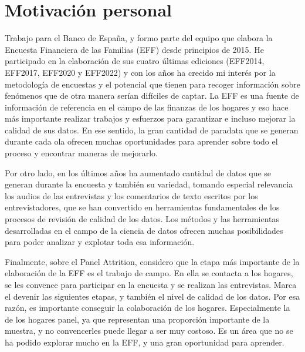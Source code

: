 \section{Motivación personal}

Trabajo para el Banco de España, y formo parte del equipo que elabora la Encuesta Financiera de las Familias (EFF) desde principios de 2015. He participado en la elaboración de sus cuatro últimas ediciones (EFF2014, EFF2017, EFF2020 y EFF2022) y con los años ha crecido mi interés por la metodología de encuestas y el potencial que tienen para recoger información sobre fenómenos que de otra manera serían difíciles de captar. La EFF es una fuente de información de referencia en el campo de las finanzas de los hogares y eso hace más importante realizar trabajos y esfuerzos para garantizar e incluso mejorar la calidad de sus datos. En ese sentido, la gran cantidad de paradata que se generan durante cada ola ofrecen muchas oportunidades para aprender sobre todo el proceso y encontrar maneras de mejorarlo.

Por otro lado, en los últimos años ha aumentado cantidad de datos que se generan durante la encuesta y también su variedad, tomando especial relevancia los audios de las entrevistas y los comentarios de texto escritos por los entrevistadores, que se han convertido en herramientas fundamentales de los procesos de revisión de calidad de los datos. Los métodos y las herramientas desarrolladas en el campo de la ciencia de datos ofrecen muchas posibilidades para poder analizar y explotar toda esa información.

Finalmente, sobre el Panel Attrition, considero que la etapa más importante de la elaboración de la EFF es el trabajo de campo. En ella se contacta a los hogares, se les convence para participar en la encuesta y se realizan las entrevistas. Marca el devenir las siguientes etapas, y también el nivel de calidad de los datos. Por esa razón, es importante conseguir la colaboración de los hogares. Especialmente la de los hogares panel, ya que representan una proporción importante de la muestra, y no convencerles puede llegar a ser muy costoso. Es un área que no se ha podido explorar mucho en la EFF, y una gran oportunidad para aprender.